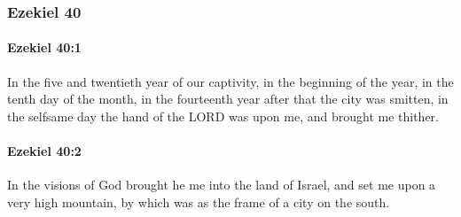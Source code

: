 	\subsubsection{Ezekiel 40} %
		\label{EZEKIEL-40}

		\paragraph{Ezekiel 40:1} %
			\label{EZEKIEL-40-1}

			In the five and twentieth year of our captivity, in the beginning of the year, in the tenth day of the month, in the fourteenth year after that the city was smitten, in the selfsame day the hand of the LORD was upon me, and brought me thither.


		\paragraph{Ezekiel 40:2} %
			\label{EZEKIEL-40-2}

			In the visions of God brought he me into the land of Israel, and set me upon a very high mountain, by which was as the frame of a city on the south.

